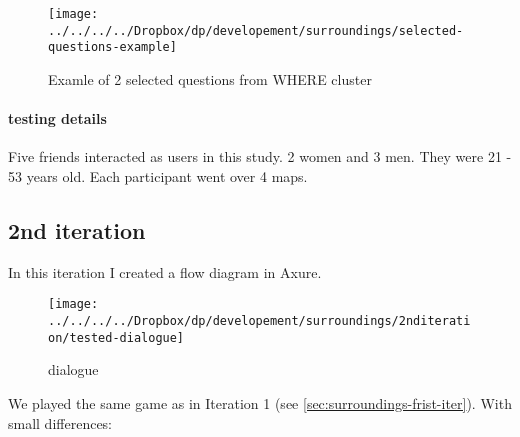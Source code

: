 				\begin{figure}[th]
					\centering
					\texttt{[image: ../../../../Dropbox/dp/developement/surroundings/selected-questions-example]}
					\caption{Examle of 2 selected questions from WHERE cluster}
					\label{fig:clusteredquestions}
				\end{figure}
			
				\paragraph{testing details}
					Five friends interacted as users in this study. 2 women and 3 men. They were 21 - 53 years old. Each participant went over 4 maps.
			
			\subsection{2nd iteration}
				In this iteration I created a flow diagram in Axure\cite{axure}. 
				
				\begin{figure}[ht]
					\centering
					\texttt{[image: ../../../../Dropbox/dp/developement/surroundings/2nditeration/tested-dialogue]}
					\caption[]{dialogue}
					\label{fig:tested-dialogue}
				\end{figure}
			
		
				We played the same game as in Iteration 1 (see \ref{sec:surroundings-frist-iter}). With small differences:
				
